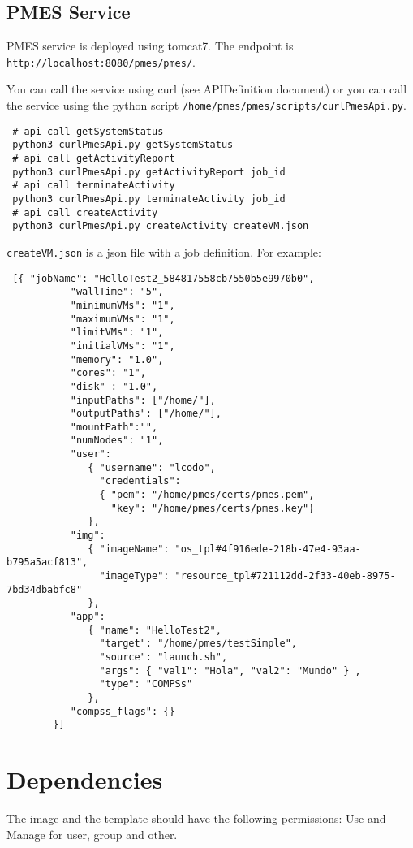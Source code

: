 \documentclass[a4paper,10pt]{article}
\begin{document}
\subsection{PMES Service}
PMES service is  deployed using tomcat7. The endpoint is \texttt{http://localhost:8080/pmes/pmes/}.

You can call the service using curl (see APIDefinition document) or you can call the service using the python script \texttt{/home/pmes/pmes/scripts/curlPmesApi.py}.

\begin{verbatim}
 # api call getSystemStatus
 python3 curlPmesApi.py getSystemStatus
 # api call getActivityReport
 python3 curlPmesApi.py getActivityReport job_id
 # api call terminateActivity
 python3 curlPmesApi.py terminateActivity job_id
 # api call createActivity
 python3 curlPmesApi.py createActivity createVM.json
\end{verbatim}

\texttt{createVM.json} is a json file with a job definition. For example:
\begin{verbatim}
 [{ "jobName": "HelloTest2_584817558cb7550b5e9970b0",
           "wallTime": "5",
           "minimumVMs": "1",
           "maximumVMs": "1",
           "limitVMs": "1",
           "initialVMs": "1",
           "memory": "1.0",
           "cores": "1",
           "disk" : "1.0",
           "inputPaths": ["/home/"],
           "outputPaths": ["/home/"],
           "mountPath":"",
           "numNodes": "1",
           "user":
              { "username": "lcodo",
                "credentials":
                { "pem": "/home/pmes/certs/pmes.pem",
                  "key": "/home/pmes/certs/pmes.key"}
              },
           "img": 
              { "imageName": "os_tpl#4f916ede-218b-47e4-93aa-b795a5acf813", 
                "imageType": "resource_tpl#721112dd-2f33-40eb-8975-7bd34dbabfc8"
              },
           "app":
              { "name": "HelloTest2",
                "target": "/home/pmes/testSimple",
                "source": "launch.sh",
                "args": { "val1": "Hola", "val2": "Mundo" } ,
                "type": "COMPSs"
              },
           "compss_flags": {}
        }]
\end{verbatim}

\section{Dependencies}
The image and the template should have the following permissions: Use and Manage for user, group and other.
\end{document}
